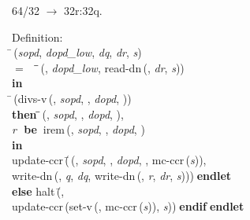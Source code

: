  64/32 $\rightarrow$ 32r:32q.
\begin{tabbing}{\sc Definition}: \\  
\=\,({\it{sopd\/}}, {\it{dopd\_low\/}}, {\it{dq\/}}, {\it{dr\/}}, {\it{s\/}}) \\ 
$=$$\;\;\;\;$\=\=\,({}, {\it{dopd\_low\/}}, {\rm{read-dn}}\,({}, {\it{dr\/}}, {\it{s\/}}))\- \\ 
{\bf in} \\ 
\=\,({\rm{divs-v}}\,({}, {\it{sopd\/}}, {}, {\it{dopd\/}}, {})) \\ 
{\bf then }\=\=\,({}, {\it{sopd\/}}, {}, {\it{dopd\/}}, {}), \\ 
{\it{r\/}}{\bf $\;$ be$\;\;$}{\rm{irem}}\,({}, {\it{sopd\/}}, {}, {\it{dopd\/}}, {})\- \\ 
{\bf in} \\ 
{\rm{update-ccr}}\,(\=\,({}, {\it{sopd\/}}, {}, {\it{dopd\/}}, {}, {\rm{mc-ccr}}\,({\it{s\/}})), \\ 
{\rm{write-dn}}\,({}, {\it{q\/}}, {\it{dq\/}}, {\rm{write-dn}}\,({}, {\it{r\/}}, {\it{dr\/}}, {\it{s\/}})))\-$\;${\bf  endlet}\- \\ 
{\bf else }{\rm{halt}}\,(\=, \\ 
{\rm{update-ccr}}\,({\rm{set-v}}\,({}, {\rm{mc-ccr}}\,({\it{s\/}})), {\it{s\/}}))\-$\;${\bf  endif}\-$\;${\bf  endlet}\-\-
\end{tabbing}

